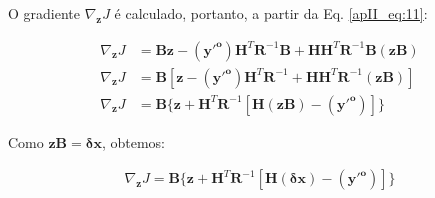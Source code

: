 O gradiente $\nabla_{\mathbf{z}}J$ é calculado, portanto, a partir da Eq. \ref{apII_eq:11}:




\begin{align}
\label{apII_eq:12}
\nabla_{\mathbf{z}}J & = \mathbf{B}\mathbf{z} - (\mathbf{y'^o})\mathbf{H}^{T}\mathbf{R}^{-1}\mathbf{B} +
\mathbf{H}\mathbf{H}^{T}\mathbf{R}^{-1}\mathbf{B}(\mathbf{z}\mathbf{B}) \\
\label{apII_eq:13}
\nabla_{\mathbf{z}}J & = \mathbf{B}[\mathbf{z} -(\mathbf{y'^o})\mathbf{H}^{T}\mathbf{R}^{-1} +
\mathbf{H}\mathbf{H}^{T}\mathbf{R}^{-1}(\mathbf{z}\mathbf{B})] \\
\label{apII_eq:14}
\nabla_{\mathbf{z}}J & = \mathbf{B}\lbrace\mathbf{z} + \mathbf{H}^{T}\mathbf{R}^{-1}[\mathbf{H}(\mathbf{z}\mathbf{B}) - (\mathbf{y'^o})]\rbrace
\end{align}

Como $\mathbf{z}\mathbf{B}=\mathbf{\delta{x}}$, obtemos:

\begin{equation}
\label{apII_eq:15}
  \begin{split}
\nabla_{\mathbf{z}}J = 
\mathbf{B}
\lbrace
\mathbf{z} +
\mathbf{H}^{T}\mathbf{R}^{-1}
[
\mathbf{H}(\mathbf{\delta{x}})
- (\mathbf{y'^o})
]
\rbrace
  \end{split}
\end{equation}

